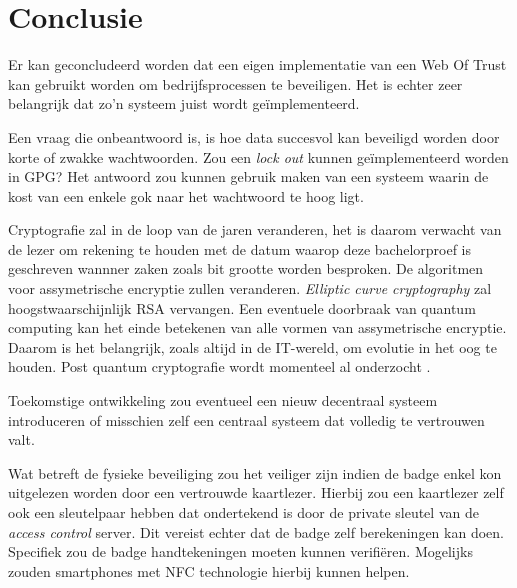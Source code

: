 
\chapter{Conclusie}
\label{ch:conclusie}


Er kan geconcludeerd worden dat een eigen implementatie van een Web Of Trust kan
gebruikt worden om bedrijfsprocessen te beveiligen. Het is echter zeer
belangrijk dat zo'n systeem juist wordt geïmplementeerd.

Een vraag die onbeantwoord is, is hoe data succesvol kan beveiligd worden door
korte of zwakke wachtwoorden. Zou een \textit{lock out} kunnen geïmplementeerd
worden in \gls{GPG}? Het antwoord zou kunnen gebruik maken van een systeem
waarin de kost van een enkele gok naar het wachtwoord te hoog ligt.

Cryptografie zal in de loop van de jaren veranderen, het is daarom verwacht
van de lezer om rekening te houden met de datum waarop deze bachelorproef is
geschreven wannner zaken zoals bit grootte worden besproken. De algoritmen voor
assymetrische encryptie zullen veranderen. \textit{Elliptic curve cryptography}
zal hoogstwaarschijnlijk RSA vervangen. Een eventuele doorbraak van quantum
computing kan het einde betekenen van alle vormen van assymetrische encryptie.
Daarom is het belangrijk, zoals altijd in de IT-wereld, om evolutie in het oog
te houden. Post quantum cryptografie wordt momenteel al onderzocht
\autocite{ANewHopeUsenix}.

Toekomstige ontwikkeling zou eventueel een nieuw decentraal systeem introduceren
of misschien zelf een centraal systeem dat volledig te vertrouwen valt.

Wat betreft de fysieke beveiliging zou het veiliger zijn indien de badge enkel
kon uitgelezen worden door een vertrouwde kaartlezer. Hierbij zou een kaartlezer
zelf ook een sleutelpaar hebben dat ondertekend is door de private sleutel van
de \textit{access control} server. Dit vereist echter dat de badge zelf
berekeningen kan doen. Specifiek zou de badge handtekeningen moeten kunnen
verifiëren. Mogelijks zouden smartphones met NFC technologie hierbij kunnen
helpen.
